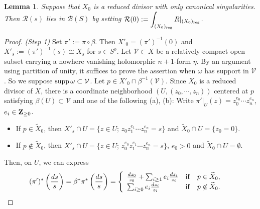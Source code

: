 \documentclass[amscd, leqno]{amsart}
\theoremstyle{plain}
\newtheorem{lemma}[theorem]{Lemma}
\theoremstyle{definition}
\theoremstyle{remark}
\newenvironment{pf}{\begin{proof}}{\end{proof}}
\begin{document}
\begin{lemma}
\label{lemma:fib:int:can:sing}
Suppose that $X_{0}$ is a reduced divisor with only canonical singularities. Then ${\mathcal R}(s)$ lies in ${\mathcal B}(S)$ 
by setting $\displaystyle {\mathcal R}(0) := \int_{(X_{0})_{\rm reg}}R|_{(X_{0})_{\rm reg}}$.
\end{lemma}

\begin{pf}
{\em (Step 1) }
Set $\pi':=\pi \circ \beta$. Then $X'_{0}=(\pi')^{-1}(0)$ and $X'_{s}:=(\pi')^{-1}(s)\cong X_{s}$ for $s\in S^{o}$.
Let ${\mathcal V} \subset X$ be a relatively compact open subset carrying a nowhere vanishing holomorphic $n+1$-form $\eta$. 
By an argument using partition of unity, it suffices to prove the assertion when $\omega$ has support in ${\mathcal V}$.
So we suppose ${\rm supp}\,\omega \subset {\mathcal V}$. Let $p\in X'_{0} \cap \beta^{-1}({\mathcal V})$. 
Since $X_{0}$ is a reduced divisor of $X$, there is a coordinate neighborhood $(U,(z_{0},\cdots,z_{n}))$ centered at $p$ satisfying
$\beta(U)\subset{\mathcal V}$ and one of the following (a), (b): 
Write $\pi'|_{U}(z)=z_{0}^{e_{0}}\cdots z_{n}^{e_{n}}$, $e_{i}\in{\bf Z}_{\geq0}$.
\begin{itemize}
\item[(a)]
If $p\in\widetilde{X}_{0}$, then $X'_{s}\cap U = \{z\in U;\,z_{0}z_{1}^{e_{1}}\cdots z_{n}^{e_{n}}=s\}$ and $\widetilde{X}_{0}\cap U=\{z_{0}=0\}$.
\item[(b)]
If $p\not\in\widetilde{X}_{0}$, then
$X'_{s}\cap U = \{z\in U;\,z_{0}^{e_{0}}z_{1}^{e_{1}}\cdots z_{n}^{e_{n}}=s\}$, $e_{0}>0$ and $\widetilde{X}_{0}\cap U=\emptyset$.
\end{itemize}
Then, on $U$, we can express
\begin{equation}
\label{eqn:pullback}
(\pi')^{*}\left(\frac{ds}{s}\right) = \beta^{*}\pi^{*}\left(\frac{ds}{s}\right) =
\begin{cases}
\begin{array}{lll}
\frac{dz_{0}}{z_{0}}+\sum_{i\geq1}e_{i}\frac{dz_{i}}{z_{i}}
&{\rm if }&p\in\widetilde{X}_{0},
\\
\sum_{i\geq0}e_{i}\frac{dz_{i}}{z_{i}}
&{\rm if }&p\not\in\widetilde{X}_{0}.
\end{array}
\end{cases}
\end{equation}

\end{pf}
\end{document}
